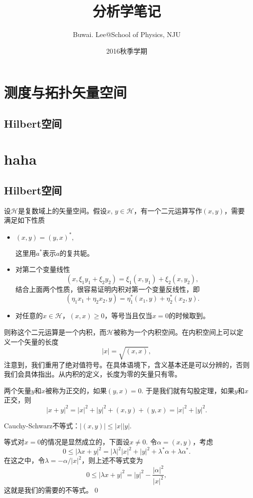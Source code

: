 \documentclass[9pt]{extbook}
\begin{document}
\title{分析学笔记}
\author{Buwai. Lee@School of Physics, NJU}
\date{2016秋季学期}
\maketitle %
\frontmatter
\tableofcontents

\mainmatter
\chapter{测度与拓扑矢量空间}
\section{Hilbert空间}


\chapter{haha}
\section{Hilbert空间}

设$\mathcal{H}$是复数域上的矢量空间。假设$x$, $y\in \mathcal{H}$，有一个二元运算写作$(x,y)$，需要满足如下性质
\begin{itemize}
\item $(x,y)=(y,x)^*,$

这里用$a^*$表示$a$的复共轭。

\item 对第二个变量线性
\[
(x,\xi_1y_1+\xi_2y_2)=\xi_1(x,y_1)+\xi_2(x,y_2),
\]
结合上面两个性质，很容易证明内积对第一个变量反线性，即
\[
(\eta_1x_1+\eta_2x_2,y)=\eta_1^*(x_1,y)+\eta_2^*(x_2,y).
\]
\item 对任意的$x\in \mathcal{H}$，$(x,x)\geq 0$，等号当且仅当$x=0$的时候取到。
\end{itemize}

则称这个二元运算是一个内积，而$\mathcal{H}$被称为一个内积空间。在内积空间上可以定义一个矢量的长度
\[
	|x|=\sqrt{(x,x)},
\]
注意到，我们重用了绝对值符号。在具体语境下，含义基本还是可以分辨的，否则我们会具体指出。从内积的定义，长度为零的矢量只有零。

\para 两个矢量$y$和$x$被称为正交的，如果$(y,x)=0$. 于是我们就有勾股定理，如果$y$和$x$正交，则
\[
	|x+y|^2=|x|^2+|y|^2+(x,y)+(y,x)=|x|^2+|y|^2.
\]

\pro Cauchy-Schwarz不等式：$|(x,y)|\leq |x||y|$.

\proof 等式对$x=0$的情况是显然成立的，下面设$x\neq 0$. 令$\alpha=(x,y)$，考虑
	\[
		0\leq |\lambda x+y|^2=|\lambda|^2|x|^2+|y|^2+\lambda^* \alpha+\lambda \alpha^*.
	\]
	在这之中，令$\lambda=-\alpha/|x|^2$，则上述不等式变为
	\[
		0\leq |\lambda x+y|^2=|y|^2-\frac{|\alpha|^2}{|x|^2},
	\]
	这就是我们的需要的不等式。\qed
\end{document}
